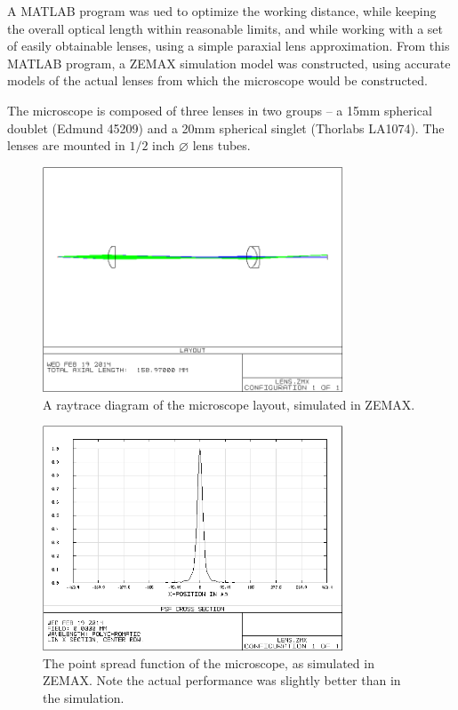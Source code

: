 A MATLAB program was ued to optimize the working distance, while keeping the overall optical length within reasonable limits, and while working with a set of easily obtainable lenses, using a simple paraxial lens approximation. From this MATLAB program, a ZEMAX simulation model was constructed, using accurate models of the actual lenses from which the microscope would be constructed.

The microscope is composed of three lenses in two groups -- a 15mm spherical doublet (Edmund 45209) and a 20mm spherical singlet (Thorlabs LA1074). The lenses are mounted in $1/2$ inch $\diameter$ lens tubes.

\begin{figure}[h!]
\centering
\includegraphics[width=0.8\textwidth]{Images/Microscope/microscope_layout.png}
\caption{A raytrace diagram of the microscope layout, simulated in ZEMAX.}
\end{figure}

\begin{figure}[h!]
\centering
\includegraphics[width=0.8\textwidth]{Images/Microscope/microscope_psf.png}
\caption{The point spread function of the microscope, as simulated in ZEMAX. Note the actual performance was slightly better than in the simulation.}
\end{figure}

